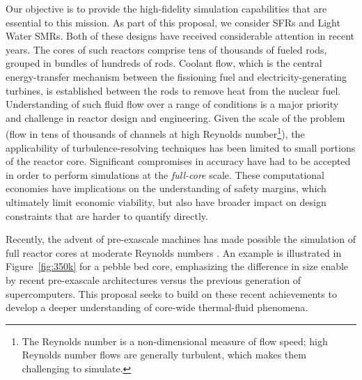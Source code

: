 Our objective is to provide the high-fidelity simulation capabilities that are
essential to this mission.  As part of this proposal, we consider SFRs and Light Water SMRs.
Both of these designs have received considerable
attention in recent years. The cores of such reactors comprise tens of
thousands of fueled rods, grouped in bundles of hundreds of rods. Coolant flow,
which is the central energy-transfer mechanism between the fissioning fuel and
electricity-generating turbines, is established between the rods to remove heat
from the nuclear fuel.  Understanding of such fluid flow over a range of
conditions is a major priority and challenge in reactor design and engineering.
Given the scale of the problem (flow in tens of thousands of channels at high
Reynolds number\footnote{The Reynolds number is a non-dimensional measure of flow
speed; high Reynolds number flows are generally turbulent, which makes them
challenging to simulate.}), the
applicability of turbulence-resolving techniques has been limited to small
portions of the reactor core. Significant compromises in accuracy have had to
be accepted in order to perform simulations at the {\em full-core} scale.
These computational economies have implications on the understanding of safety
margins, which ultimately limit economic viability, but also have broader impact
on design constraints that are harder to quantify directly.

Recently, the advent of pre-exascale machines has made possible the simulation
of full reactor cores at moderate Reynolds numbers \cite{Fang2021}.  An example
is illustrated in Figure~\ref{fig:350k} for a pebble bed core, emphasizing the difference
in size enable by recent pre-exascale architectures versus the previous generation of supercomputers.
This proposal seeks to build on these recent achievements to develop a deeper
understanding of core-wide thermal-fluid phenomena.

